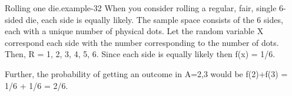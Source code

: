 \documentclass[10pt,]{book}
\numberwithin{equation}{section}
\begin{document}
%
\par
\hypertarget{p-782}{}%
\begin{example}{Rolling one die.}{example-32}%
\hypertarget{p-783}{}%
When you consider rolling a regular, fair, single 6-sided die, each side is equally likely. The sample space consists of the 6 sides, each with a unique number of physical dots. Let the random variable X correspond each side with the number corresponding to the number of dots. Then, R = {1, 2, 3, 4, 5, 6}.  Since each side is equally likely then f(x) = 1/6.%
\par
\hypertarget{p-784}{}%
Further, the probability of getting an outcome in A={2,3} would be f(2)+f(3) = 1/6 + 1/6 = 2/6.%
\end{example}
%
%
%
\typeout{************************************************}
\typeout{************************************************}
%
\end{document}
